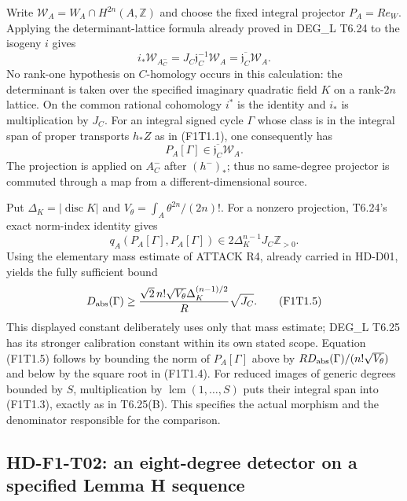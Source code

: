 Write $\mathscr W_A=W_A\cap H^{2n}(A,\mathbb Z)$ and choose the
fixed integral projector $P_A=R e_W$. Applying the determinant-lattice
formula already proved in DEG\_L T6.24 to the isogeny $i$ gives
\[
 i_*\mathscr W_{A^-_C}
   =J_C\mathfrak j_C^{-1}\mathscr W_A
   =\overline{\mathfrak j_C}\mathscr W_A.
 \tag{F1T1.2}
\]
No rank-one hypothesis on $C$-homology occurs in this calculation:
the determinant is taken over the specified imaginary quadratic
field $K$ on a rank-$2n$ lattice. On the common rational cohomology
$i^*$ is the identity and $i_*$ is multiplication by $J_C$.
For an integral signed cycle $\Gamma$ whose class is in the integral
span of proper transports $h_*Z$ as in (F1T1.1), one consequently has
\[
 P_A[\Gamma]\in\overline{\mathfrak j_C}\mathscr W_A.
 \tag{F1T1.3}
\]
The projection is applied on $A^-_C$ after $(h^-)_*$; thus no
same-degree projector is commuted through a map from a
different-dimensional source.

Put $\Delta_K=|\operatorname{disc}K|$ and
$V_\theta=\int_A\theta^{2n}/(2n)!$.
For a nonzero projection, T6.24's exact norm-index identity gives
\[
 q_A(P_A[\Gamma],P_A[\Gamma])
     \in 2\Delta_K^{n-1}J_C\mathbb Z_{>0}.
 \tag{F1T1.4}
\]
Using the elementary mass estimate of ATTACK R4, already carried
in HD-D01, yields the fully sufficient bound
\[
 D_{\rm abs}(\Gamma)\ge
 \frac{\sqrt2\,n!\sqrt{V_\theta}\Delta_K^{(n-1)/2}}{R}
           \sqrt{J_C}.
 \tag{F1T1.5}
\]
This displayed constant deliberately uses only that mass estimate;
DEG\_L T6.25 has its stronger calibration constant within its own
stated scope. Equation (F1T1.5) follows by bounding the norm of
$P_A[\Gamma]$ above by
$R D_{\rm abs}(\Gamma)/(n!\sqrt{V_\theta})$ and below by
the square root in (F1T1.4).
For reduced images of generic degrees bounded by $S$, multiplication
by $\operatorname{lcm}(1,\ldots,S)$ puts their integral span into
(F1T1.3), exactly as in T6.25(B). This specifies the actual morphism
and the denominator responsible for the comparison.

\subsection{HD-F1-T02: an eight-degree detector on a specified Lemma H sequence}

